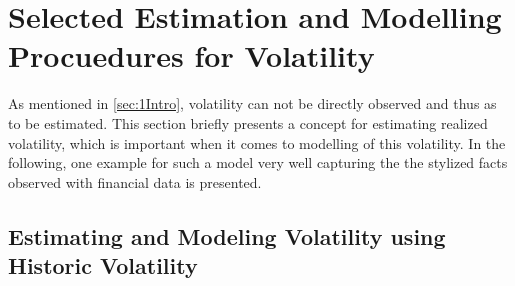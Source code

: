 
\section{Selected Estimation and Modelling Procuedures for Volatility}\label{sec:2Models}
As mentioned in \ref{sec:1Intro}, volatility can not be directly observed and thus as to be estimated. This section briefly presents a concept for estimating realized volatility, which is important when it comes to modelling of this volatility. In the following, one example for such a model very well capturing the the stylized facts observed with financial data is presented. 

\subsection{Estimating and Modeling Volatility using Historic Volatility}\label{sec:22Historic}
%
